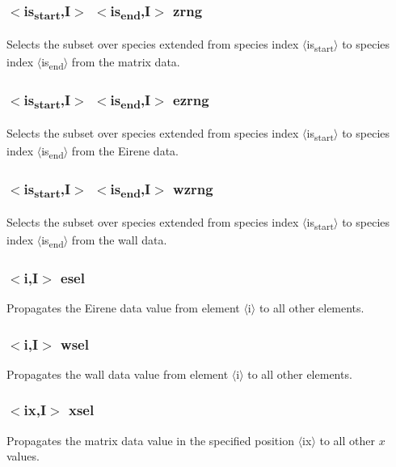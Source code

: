 \documentclass[a4paper,10pt]{report}
\begin{document}
\subsubsection{$<$is\textsubscript{start},{\bf I}$>$ $<$is\textsubscript{end},{\bf I}$>$ zrng}\label{sec:zrng}
Selects the subset over species extended from species index $\langle$is\textsubscript{start}$\rangle$ to
species index $\langle$is\textsubscript{end}$\rangle$ from the matrix data.

\subsubsection{$<$is\textsubscript{start},{\bf I}$>$ $<$is\textsubscript{end},{\bf I}$>$ ezrng}\label{sec:ezrng}
Selects the subset over species extended from species index $\langle$is\textsubscript{start}$\rangle$ to
species index $\langle$is\textsubscript{end}$\rangle$ from the Eirene data.

\subsubsection{$<$is\textsubscript{start},{\bf I}$>$ $<$is\textsubscript{end},{\bf I}$>$ wzrng}\label{sec:wzrng}
Selects the subset over species extended from species index $\langle$is\textsubscript{start}$\rangle$ to
species index $\langle$is\textsubscript{end}$\rangle$ from the wall data.

\subsubsection{$<$i,{\bf I}$>$ esel}\label{sec:esel}
Propagates the Eirene data value from element $\langle$i$\rangle$ to all other elements.

\subsubsection{$<$i,{\bf I}$>$ wsel}\label{sec:wsel}
Propagates the wall data value from element $\langle$i$\rangle$ to all other elements.

\subsubsection{$<$ix,{\bf I}$>$ xsel}\label{sec:xsel}
Propagates the matrix data value in the specified position $\langle$ix$\rangle$ to all other $x$ values.
\end{document}
